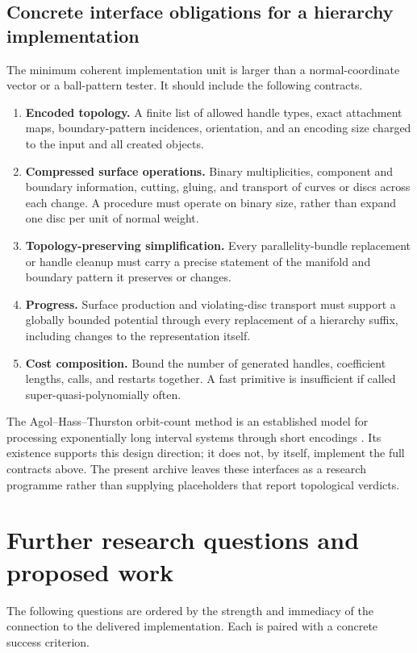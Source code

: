 \subsection{Concrete interface obligations for a hierarchy implementation}
The minimum coherent implementation unit is larger than a normal-coordinate
vector or a ball-pattern tester. It should include the following contracts.
\begin{enumerate}
\item \textbf{Encoded topology.} A finite list of allowed handle types, exact
attachment maps, boundary-pattern incidences, orientation, and an encoding
size charged to the input and all created objects.
\item \textbf{Compressed surface operations.} Binary multiplicities,
component and boundary information, cutting, gluing, and transport of curves
or discs across each change. A procedure must operate on binary size, rather
than expand one disc per unit of normal weight.
\item \textbf{Topology-preserving simplification.} Every parallelity-bundle
replacement or handle cleanup must carry a precise statement of the
manifold and boundary pattern it preserves or changes.
\item \textbf{Progress.} Surface production and violating-disc transport
must support a globally bounded potential through every replacement of a
hierarchy suffix, including changes to the representation itself.
\item \textbf{Cost composition.} Bound the number of generated handles,
coefficient lengths, calls, and restarts together. A fast primitive is
insufficient if called super-quasi-polynomially often.
\end{enumerate}
The Agol--Hass--Thurston orbit-count method is an established model for
processing exponentially long interval systems through short encodings
\cite{aht}. Its existence supports this design direction; it does not, by
itself, implement the full contracts above. The present archive leaves
these interfaces as a research programme rather than supplying placeholders
that report topological verdicts.

\section{Further research questions and proposed work}
\label{sec:questions}

The following questions are ordered by the strength and immediacy of the
connection to the delivered implementation. Each is paired with a concrete
success criterion.

